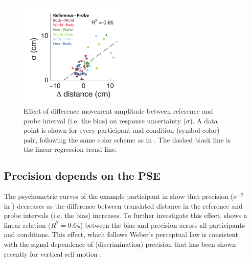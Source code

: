 \begin{figure}
    \includegraphics[width=0.5\textwidth]{src/paper3/figure5.pdf}

    \caption{Effect of difference movement amplitude between reference and probe interval (i.e. the bias) on response uncertainty ($\sigma$). A data point is shown for every participant and condition (symbol color) pair, following the same color scheme as in . The dashed black line is the linear regression trend line.}
    
    \label{p3:fig5}
\end{figure}

\subsection{Precision depends on the PSE}
\label{p3:sec:precision}

The psychometric curves of the example participant in  show that precision ($\sigma^{-2}$ in ) decreases as the difference between translated distance in the reference and probe intervals (i.e. the bias) increases. To further investigate this effect,  shows a linear relation ($R^2 = 0.64$) between the bias and precision across all participants and conditions. This effect, which follows Weber’s perceptual law \cite{fechner1860} is consistent with the signal-dependence of (discrimination) precision that has been shown recently for vertical self-motion \cite{nesti2014}.

